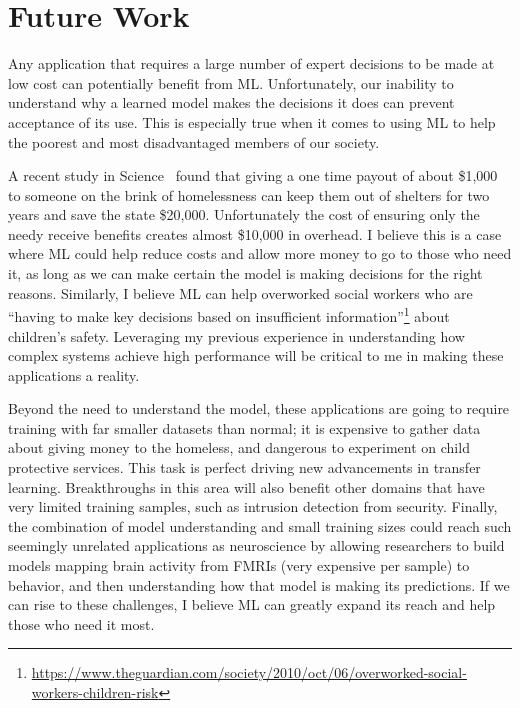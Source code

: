 \documentclass[a4paper, 11pt]{article}
\begin{document}
\section{Future Work}
Any application that requires a large number of expert decisions to be made at low
cost can potentially benefit from ML. Unfortunately, our inability to understand
why a learned model makes the decisions it does can prevent acceptance of its use. This is
especially true when it comes to using ML to help the poorest and most disadvantaged
members of our society.

A recent study in Science~\cite{evans:2016:homelessness} found that
giving a one time payout of about \$1,000 to someone on the brink of homelessness
can keep them out of shelters for two years and save the state \$20,000. Unfortunately the cost
of ensuring only the needy receive benefits creates almost \$10,000 in overhead.
I believe this is a case where ML could help reduce costs and allow more money to go to
those who need it, as long as we can make certain the model is making decisions for the right reasons.
Similarly, I believe ML can help overworked social workers who are
``having to make key decisions based on insufficient
information''\footnote{\url{https://www.theguardian.com/society/2010/oct/06/overworked-social-workers-children-risk}}
about children's safety.
Leveraging my previous experience in understanding how complex systems achieve high performance
will be critical to me in making these applications a reality.

Beyond the need to understand the model, these applications are going to require training
with far smaller datasets than normal; it is expensive to gather data about giving money
to the homeless, and dangerous to experiment on child protective services. This
task is perfect driving new advancements in transfer learning. Breakthroughs
in this area will also benefit other domains that have very limited training samples,
such as intrusion detection from security. Finally, the combination of model understanding
and small training sizes could reach such seemingly unrelated applications as neuroscience
by allowing researchers to build models mapping brain activity from FMRIs (very expensive per sample)
to behavior, and then understanding how that model is making its predictions.
If we can rise to these challenges, I believe ML can greatly expand its reach
and help those who need it most.


\small



\end{document}
